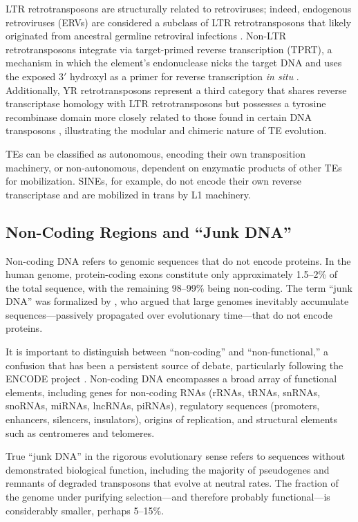 LTR retrotransposons are structurally related to retroviruses; indeed, endogenous retroviruses (ERVs) are considered a subclass of LTR retrotransposons that likely originated from ancestral germline retroviral infections \parencite{jern2008}. Non-LTR retrotransposons integrate via target-primed reverse transcription (TPRT), a mechanism in which the element's endonuclease nicks the target DNA and uses the exposed 3$'$ hydroxyl as a primer for reverse transcription \textit{in situ} \parencite{luan1993}. Additionally, YR retrotransposons represent a third category that shares reverse transcriptase homology with LTR retrotransposons but possesses a tyrosine recombinase domain more closely related to those found in certain DNA transposons \parencite{goodwin2003}, illustrating the modular and chimeric nature of TE evolution.

TEs can be classified as autonomous, encoding their own transposition machinery, or non-autonomous, dependent on enzymatic products of other TEs for mobilization. SINEs, for example, do not encode their own reverse transcriptase and are mobilized in trans by L1 machinery.

\subsection{Non-Coding Regions and ``Junk DNA''}

Non-coding DNA refers to genomic sequences that do not encode proteins. In the human genome, protein-coding exons constitute only approximately 1.5--2\% of the total sequence, with the remaining 98--99\% being non-coding. The term ``junk DNA'' was formalized by \textcite{ohno1972}, who argued that large genomes inevitably accumulate sequences---passively propagated over evolutionary time---that do not encode proteins.

It is important to distinguish between ``non-coding'' and ``non-functional,'' a confusion that has been a persistent source of debate, particularly following the ENCODE project \parencite{encode2012,doolittle2013,graur2013}. Non-coding DNA encompasses a broad array of functional elements, including genes for non-coding RNAs (rRNAs, tRNAs, snRNAs, snoRNAs, miRNAs, lncRNAs, piRNAs), regulatory sequences (promoters, enhancers, silencers, insulators), origins of replication, and structural elements such as centromeres and telomeres.

True ``junk DNA'' in the rigorous evolutionary sense refers to sequences without demonstrated biological function, including the majority of pseudogenes and remnants of degraded transposons that evolve at neutral rates. The fraction of the genome under purifying selection---and therefore probably functional---is considerably smaller, perhaps 5--15\%.

